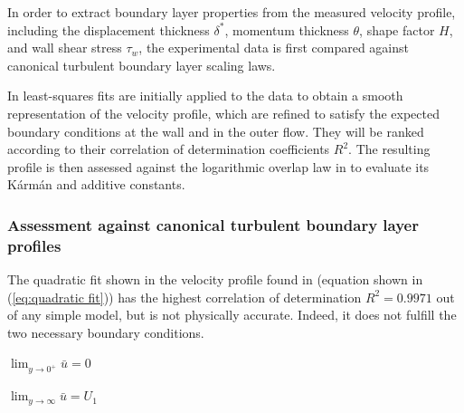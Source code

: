\documentclass{article}
\begin{document}
In order to extract boundary layer properties from the measured velocity profile, including the displacement thickness $\delta^*$, momentum thickness $\theta$, shape factor $H$, and wall shear stress $\tau_w$, the experimental data is first compared against canonical turbulent boundary layer scaling laws. 

In  least-squares fits are initially applied to the data to obtain a smooth representation of the velocity profile, which are refined to satisfy the expected boundary conditions at the wall and in the outer flow. They will be ranked according to their correlation of determination coefficients $R^2$. The resulting profile is then assessed against the logarithmic overlap law in  to evaluate its K\'arm\'an and additive constants.

\subsubsection{Assessment against canonical turbulent boundary layer profiles}
\label{sec: canonical profiles}

The quadratic fit shown in the velocity profile found in  (equation shown in (\ref{eq:quadratic fit})) has the highest correlation of determination $R^2=0.9971$ out of any simple model, but is not physically accurate. Indeed, it does not fulfill the two necessary boundary conditions.

\begin{enumerate*}[itemjoin={\hspace{16em}}]
    \item $\displaystyle \lim_{y \to 0^+} \bar{u} = 0$
    \item $\displaystyle \lim_{y \to \infty} {\bar{u}} = U_1$
\end{enumerate*}
\end{document}
